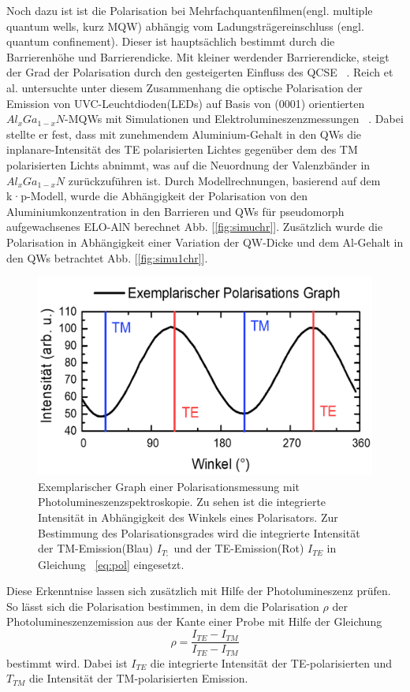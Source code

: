 %
Noch dazu ist ist die Polarisation bei Mehrfachquantenfilmen(engl. multiple quantum wells, kurz MQW) abhängig vom Ladungsträgereinschluss (engl. quantum confinement). Dieser ist hauptsächlich bestimmt durch die Barrierenhöhe und Barrierendicke. Mit kleiner werdender Barrierendicke, steigt der Grad der Polarisation durch den gesteigerten Einfluss des QCSE ~\cite{PhysRevB.84.035305}. 
Reich et al. untersuchte unter diesem Zusammenhang die optische Polarisation der Emission von UVC-Leuchtdioden(LEDs) auf Basis von (0001) orientierten $Al_{x}Ga_{1-x}N$-MQWs mit Simulationen und Elektrolumineszenzmessungen ~\cite{doi:10.1063/1.4932651}. Dabei stellte er fest, dass mit zunehmendem Aluminium-Gehalt in den QWs die inplanare-Intensität des TE polarisierten Lichtes gegenüber dem des TM polarisierten Lichts abnimmt, was auf die Neuordnung der Valenzbänder in $Al_{x}Ga_{1-x}N$ zurückzuführen ist. 
Durch Modellrechnungen, basierend auf dem k·p-Modell, wurde die Abhängigkeit der Polarisation von den Aluminiumkonzentration in den Barrieren und QWs für pseudomorph aufgewachsenes ELO-AlN berechnet Abb. [\ref{fig:simuchr}]. Zusätzlich wurde die Polarisation in Abhängigkeit einer Variation der QW-Dicke und dem Al-Gehalt in den QWs betrachtet Abb. [\ref{fig:simu1chr}].
%
\begin{figure}[htb]
  \centering
  \begin{minipage}[t]{\linewidth}
      \centering
      \includegraphics[width=0.8\linewidth]{Bilder/exemplPolGraph.png}
      \caption{Exemplarischer Graph einer Polarisationsmessung mit Photolumineszenzspektroskopie. Zu sehen ist die integrierte Intensität in Abhängigkeit des Winkels eines Polarisators. Zur Bestimmung des Polarisationsgrades wird die integrierte Intensität der TM-Emission(Blau) $I_{T;}$  und der TE-Emission(Rot) $I_{TE}$ in Gleichung ~\ref{eq:pol} eingesetzt.}
      \label{fig:degra}
  \end{minipage}
\end{figure}
\vspace{1cm}
\raggedright
%
Diese Erkenntnise lassen sich zusätzlich mit Hilfe der Photolumineszenz prüfen. So lässt sich die Polarisation bestimmen, in dem die Polarisation $\rho$ der Photolumineszenzemission aus der Kante einer Probe mit Hilfe der Gleichung 
\begin{equation}
\rho = \frac{ I_{TE} - I_{TM} }{ I_{TE} - I_{TM} } 
\label{eq:pol}
\end{equation}
bestimmt wird. Dabei ist $I_{TE}$ die integrierte Intensität der TE-polarisierten und $T_{TM}$ die Intensität der TM-polarisierten Emission. 
 


